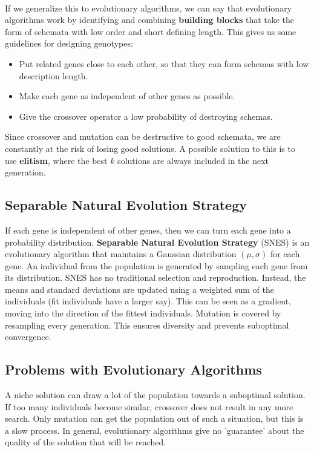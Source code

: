 \documentclass[12pt]{article}
\begin{document}
\noindent
\\
If we generalize this to evolutionary algorithms, we can say that evolutionary algorithms work by identifying and combining \textbf{building blocks} that take the form of schemata with low order and short defining length.
This gives us some guidelines for designing genotypes:

\begin{itemize}
    \item Put related genes close to each other, so that they can form schemas with low description length.
    \item Make each gene as independent of other genes as possible.
    \item Give the crossover operator a low probability of destroying schemas.
\end{itemize}

\noindent
Since crossover and mutation can be destructive to good schemata, we are constantly at the risk of losing good solutions.
A possible solution to this is to use \textbf{elitism}, where the best $k$ solutions are always included in the next generation.

\subsection{Separable Natural Evolution Strategy}
If each gene is independent of other genes, then we can turn each gene into a probability distribution.
\textbf{Separable Natural Evolution Strategy} (SNES) is an evolutionary algorithm that maintains a Gaussian distribution $(\mu, \sigma)$ for each gene.
An individual from the population is generated by sampling each gene from its distribution.
SNES has no traditional selection and reproduction.
Instead, the means and standard deviations are updated using a weighted sum of the individuals (fit individuals have a larger say).
This can be seen as a gradient, moving into the direction of the fittest individuals.
Mutation is covered by resampling every generation.
This ensures diversity and prevents suboptimal convergence.

\newpage
\subsection{Problems with Evolutionary Algorithms}
A niche solution can draw a lot of the population towards a suboptimal solution.
If too many individuals become similar, crossover does not result in any more search.
Only mutation can get the population out of such a situation, but this is a slow process.
In general, evolutionary algorithms give no 'guarantee' about the quality of the solution that will be reached.
\end{document}
